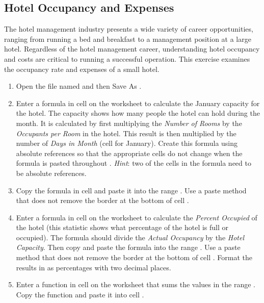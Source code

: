 \subsection{Hotel Occupancy and Expenses}

The hotel management industry presents a wide variety of career opportunities, ranging from running a bed and breakfast to a management position at a large hotel. Regardless of the hotel management career, understanding hotel occupancy and costs are critical to running a successful operation. This exercise examines the occupancy rate and expenses of a small hotel.

\begin{enumbox}
	\begin{enumerate}
		\item Open the file named  and then Save As .
		
		\item Enter a formula in cell  on the  worksheet to calculate the January capacity for the hotel. The capacity shows how many people the hotel can hold during the month. It is calculated by first multiplying the \textit{Number of Rooms} by the \textit{Occupants per Room} in the hotel. This result is then multiplied by the number of \textit{Days in Month} (cell  for January). Create this formula using absolute references so that the appropriate cells do not change when the formula is pasted throughout . \textit{Hint}: two of the cells in the formula need to be absolute references.
		
		\item Copy the formula in cell  and paste it into the range . Use a paste method that does not remove the border at the bottom of cell .
		
		\item Enter a formula in cell  on the  worksheet to calculate the \textit{Percent Occupied} of the hotel (this statistic shows what percentage of the hotel is full or occupied). The formula should divide the \textit{Actual Occupancy} by the \textit{Hotel Capacity}. Then copy and paste the formula into the range . Use a paste method that does not remove the border at the bottom of cell . Format the results in  as percentages with two decimal places.
		
		\item Enter a function in cell  on the  worksheet that sums the values in the range . Copy the function and paste it into cell .
		

\end{enumerate}
\end{enumbox}
